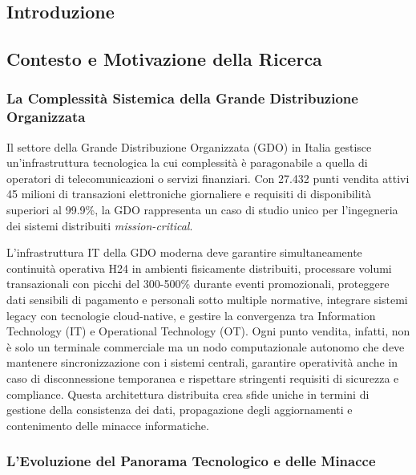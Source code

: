 \begin{refsection}
    

\chapter{Introduzione}

\section{Contesto e Motivazione della Ricerca}

\subsection{La Complessità Sistemica della Grande Distribuzione Organizzata}

Il settore della Grande Distribuzione Organizzata (GDO) in Italia gestisce un'infrastruttura tecnologica la cui complessità è paragonabile a quella di operatori di telecomunicazioni o servizi finanziari. Con 27.432 punti vendita attivi\autocite{istat2024} 45 milioni di transazioni elettroniche giornaliere e requisiti di disponibilità superiori al 99.9\%, la GDO rappresenta un caso di studio unico per l'ingegneria dei sistemi distribuiti\textit{ mission-critical}.

L'infrastruttura IT della GDO moderna deve garantire simultaneamente continuità operativa H24 in ambienti fisicamente distribuiti, processare volumi transazionali con picchi del 300-500\% durante eventi promozionali\autocite{Osservatorio2024}, proteggere dati sensibili di pagamento e personali sotto multiple normative, integrare sistemi legacy con tecnologie cloud-native, e gestire la convergenza tra Information Technology (IT) e Operational Technology (OT). Ogni punto vendita, infatti, non è solo un terminale commerciale ma un nodo computazionale autonomo che deve mantenere sincronizzazione con i sistemi centrali, garantire operatività anche in caso di disconnessione temporanea e rispettare stringenti requisiti di sicurezza e compliance. Questa architettura distribuita crea sfide uniche in termini di gestione della consistenza dei dati, propagazione degli aggiornamenti e contenimento delle minacce informatiche.

\subsection{L'Evoluzione del Panorama Tecnologico e delle Minacce}


\end{refsection}
